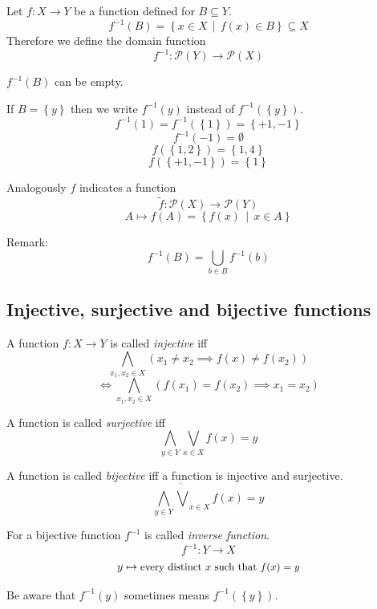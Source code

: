 \documentclass[a4paper,landscape,twocolumn]{article}
\newcommand\set[1]{\left\{#1\right\}}
\newcommand\setdef[2]{\left\{#1\,\middle|\,#2\right\}}
\begin{document}
Let $f: X \rightarrow Y$ be a function defined for $B \subseteq Y$.
\[ f^{-1}(B) = \setdef{x \in X}{f(x) \in B} \subseteq X \]
Therefore we define the domain function
\[ f^{-1}: \mathcal{P}(Y) \rightarrow \mathcal{P}(X) \]

$f^{-1}(B)$ can be empty.

If $B = \set{y}$ then we write $f^{-1}(y)$ instead of $f^{-1}(\set{y})$.
\[ f^{-1}(1) = f^{-1}(\set{1}) = \set{+1, -1} \]
\[ f^{-1}(-1) = \emptyset \]
\[ f(\set{1, 2}) = \set{1,4} \]
\[ f(\set{+1, -1}) = \set{1} \]

Analogously $f$ indicates a function
\[ \tilde f: \mathcal{P}(X) \rightarrow \mathcal{P}(Y) \]
\[ A \mapsto f(A) = \setdef{f(x)}{x \in A} \]

Remark:
\[ f^{-1}(B) = \bigcup_{b \in B} f^{-1}(b) \]

\subsection{Injective, surjective and bijective functions}

A function $f: X \rightarrow Y$ is called \emph{injective} iff
\[ \bigwedge_{x_1,x_2 \in X} (x_1 \neq x_2 \implies f(x) \neq f(x_2)) \]
\[ \iff \bigwedge_{x_1,x_2 \in X} (f(x_1) = f(x_2) \implies x_1 = x_2) \]

A function is called \emph{surjective} iff
\[ \bigwedge_{y \in Y} \bigvee_{x \in X} f(x) = y \]

A function is called \emph{bijective} iff a function is injective and surjective.
\[ \bigwedge_{y \in Y} \dot\bigvee_{x \in X} f(x) = y \]

For a bijective function $f^{-1}$ is called \emph{inverse function}.
\[ f^{-1}: Y \rightarrow X \]
\[ y \mapsto \text{\small every distinct $x$ such that $f(x) = y$} \]

Be aware that $f^{-1}(y)$ sometimes means $f^{-1}(\set{y})$.
\end{document}
